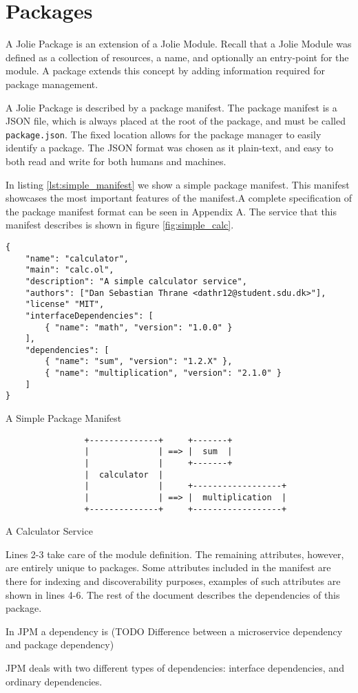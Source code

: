 
\section{Packages}

A Jolie Package is an extension of a Jolie Module. Recall that a Jolie Module
was defined as a collection of resources, a name, and optionally an entry-point
for the module. A package extends this concept by adding information required
for package management. %

A Jolie Package is described by a package manifest. The package manifest is a
JSON file, which is always placed at the root of the package, and must be
called \verb!package.json!. The fixed location allows for the package manager
to easily identify a package. The JSON format was chosen as it plain-text, and
easy to both read and write for both humans and machines.

In listing \ref{lst:simple_manifest} we show a simple package manifest. This
manifest showcases the most important features of the manifest.A complete
specification of the package manifest format can be seen in Appendix A. The
service that this manifest describes is shown in figure \ref{fig:simple_calc}.

\begin{listing}[H]
\begin{verbatim}
{
    "name": "calculator",
    "main": "calc.ol",
    "description": "A simple calculator service",
    "authors": ["Dan Sebastian Thrane <dathr12@student.sdu.dk>"],
    "license" "MIT",
    "interfaceDependencies": [
        { "name": "math", "version": "1.0.0" }
    ],
    "dependencies": [
        { "name": "sum", "version": "1.2.X" },
        { "name": "multiplication", "version": "2.1.0" }
    ]
}
\end{verbatim}
\caption{A Simple Package Manifest}
\label{lst:simple_manifest}
\end{listing}

\begin{listing}[H]
\begin{verbatim}
                +--------------+     +-------+
                |              | ==> |  sum  |
                |              |     +-------+
                |  calculator  |
                |              |     +------------------+
                |              | ==> |  multiplication  |
                +--------------+     +------------------+
\end{verbatim}
\caption{A Calculator Service}
\label{fig:simple_calc}
\end{listing}

Lines 2-3 take care of the module definition. The remaining attributes,
however, are entirely unique to packages. Some attributes included in the
manifest are there for indexing and discoverability purposes, examples of such
attributes are shown in lines 4-6. The rest of the document describes the
dependencies of this package.

In JPM a dependency is (TODO Difference between a microservice dependency and
package dependency)

JPM deals with two different types of dependencies: interface dependencies, and
ordinary dependencies.
